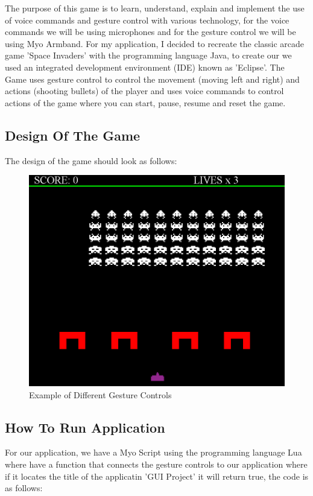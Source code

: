 \documentclass{article}
\begin{document}
The purpose of this game is to learn, understand, explain and implement the use of voice commands and gesture control with various technology, for the voice commands we will be using microphones and for the gesture control we will be using Myo Armband. For my application, I decided to recreate the classic arcade game 'Space Invaders' with the programming language Java, to create our we used an integrated development environment (IDE) known as 'Eclipse'. The Game uses gesture control to control the movement (moving left and right) and actions (shooting bullets) of the player and uses voice commands to control actions of the game where you can start, pause, resume and reset the game.

\subsection{Design Of The Game}

The design of the game should look as follows:
\begin{figure}[h]
  \includegraphics[scale=0.25]{img/gamescreen.png}
  \centering
  \caption{Example of Different Gesture Controls}
  \label{fig: Myo Armband Gesture Controls}
\end{figure}

\subsection{How To Run Application}

For our application, we have a Myo Script using the programming language Lua where have a function that connects the gesture controls to our application where if it locates the title of the applicatin 'GUI Project' it will return true, the code is as follows:
\end{document}
